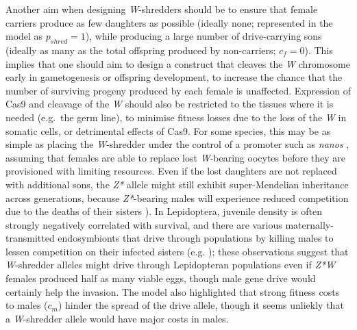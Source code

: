 \documentclass[]{rsos}%
\begin{document}
Another aim when designing \emph{W}-shredders should be to ensure that
female carriers produce as few daughters as possible (ideally none;
represented in the model as \(p_{shred}=1\)), while producing a large
number of drive-carrying sons (ideally as many as the total offspring
produced by non-carriers; \(c_f=0\)). This implies that one should aim
to design a construct that cleaves the \emph{W} chromosome early in
gametogenesis or offspring development, to increase the chance that the
number of surviving progeny produced by each female is unaffected.
Expression of Cas9 and cleavage of the \emph{W} should also be
restricted to the tissues where it is needed (e.g.~the germ line), to
minimise fitness losses due to the loss of the \emph{W} in somatic
cells, or detrimental effects of Cas9. For some species, this may be as
simple as placing the \emph{W}-shredder under the control of a promoter
such as \emph{nanos} \citep{champer2018re, zhang2018si}, assuming that
females are able to replace lost \emph{W}-bearing oocytes before they
are provisioned with limiting resources. Even if the lost daughters are
not replaced with additional sons, the \emph{Z*} allele might still
exhibit super-Mendelian inheritance across generations, because
\emph{Z*}-bearing males will experience reduced competition due to the
deaths of their sisters \citep[somewhat like the selfish genetic element
\emph{Medea};][]{hay2010en}). In Lepidoptera, juvenile density is often
strongly negatively correlated with survival, and there are various
maternally-transmitted endosymbionts that drive through populations by
killing males to lessen competition on their infected sisters (e.g.
\citep{jiggins2000bu, jiggins2003ma}); these observations suggest that
\emph{W}-shredder alleles might drive through Lepidopteran populations
even if \emph{Z*W} females produced half as many viable eggs, though
male gene drive would certainly help the invasion. The model also
highlighted that strong fitness costs to males (\(c_m\)) hinder the
spread of the drive allele, though it seems unliekly that a
\emph{W}-shredder allele would have major costs in males.
\end{document}
